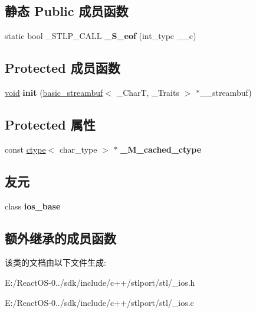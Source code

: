 \subsection*{静态 Public 成员函数}
\begin{DoxyCompactItemize}
\item 
\mbox{\label{classbasic__ios_a415926b3e2da8d14c231a506413cc3fc}} 
static bool \+\_\+\+S\+T\+L\+P\+\_\+\+C\+A\+LL {\bfseries \+\_\+\+S\+\_\+eof} (int\+\_\+type \+\_\+\+\_\+c)
\end{DoxyCompactItemize}
\subsection*{Protected 成员函数}
\begin{DoxyCompactItemize}
\item 
\mbox{\label{classbasic__ios_a7528367243394daf7cc77966dabd20d1}} 
\hyperlink{interfacevoid}{void} {\bfseries init} (\hyperlink{classbasic__streambuf}{basic\+\_\+streambuf}$<$ \+\_\+\+CharT, \+\_\+\+Traits $>$ $\ast$\+\_\+\+\_\+streambuf)
\end{DoxyCompactItemize}
\subsection*{Protected 属性}
\begin{DoxyCompactItemize}
\item 
\mbox{\label{classbasic__ios_aacc26328ca2902a41bde0a3e2113cc36}} 
const \hyperlink{classctype}{ctype}$<$ char\+\_\+type $>$ $\ast$ {\bfseries \+\_\+\+M\+\_\+cached\+\_\+ctype}
\end{DoxyCompactItemize}
\subsection*{友元}
\begin{DoxyCompactItemize}
\item 
\mbox{\label{classbasic__ios_ae00922dec509467af39af3a99a41cd52}} 
class {\bfseries ios\+\_\+base}
\end{DoxyCompactItemize}
\subsection*{额外继承的成员函数}


该类的文档由以下文件生成\+:\begin{DoxyCompactItemize}
\item 
E\+:/\+React\+O\+S-\/0../sdk/include/c++/stlport/stl/\+\_\+ios.\+h\item 
E\+:/\+React\+O\+S-\/0../sdk/include/c++/stlport/stl/\+\_\+ios.\+c\end{DoxyCompactItemize}

